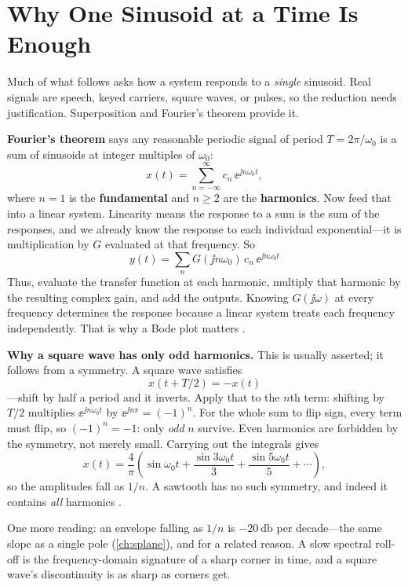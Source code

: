 \section{Why One Sinusoid at a Time Is Enough}
\label{sec:fourier}
Much of what follows asks how a system responds to a \emph{single} sinusoid. Real
signals are speech, keyed carriers, square waves, or pulses, so the reduction needs
justification. Superposition and Fourier's theorem provide it.

\textbf{Fourier's theorem} says any reasonable periodic signal of period
\(T=2\pi/\omega_0\) is a sum of sinusoids at integer multiples of \(\omega_0\):
\[
x(t)=\sum_{n=-\infty}^{\infty}c_n\,\ee^{\jj n\omega_0 t},
\]
where \(n=1\) is the \textbf{fundamental} and \(n\ge2\) are the
\textbf{harmonics}. Now feed that into a linear system. Linearity means the
response to a sum is the sum of the responses, and we already know the response to
each individual exponential---it is multiplication by \(G\) evaluated at that
frequency. So
\[
\boxed{\;y(t)=\sum_{n}G(\jj n\omega_0)\,c_n\,\ee^{\jj n\omega_0 t}\;}
\]
Thus, evaluate the transfer function at each harmonic, multiply that harmonic by
the resulting complex gain, and add the outputs. Knowing \(G(\jj\omega)\) at every
frequency determines the response because a linear system treats each frequency
independently. That is why a Bode plot matters
\cite[pp.~47--48, 54--56]{leigh2012control}.

\begin{physicalbox}
\textbf{Why a square wave has only odd harmonics.} This is usually asserted; it
follows from a symmetry. A square wave satisfies
\[
x(t+T/2)=-x(t)
\]
---shift by half a period and it inverts. Apply that to the \(n\)th term: shifting
by \(T/2\) multiplies \(\ee^{\jj n\omega_0t}\) by \(\ee^{\jj n\pi}=(-1)^n\). For the
whole sum to flip sign, every term must flip, so \((-1)^n=-1\): only \emph{odd}
\(n\) survive. Even harmonics are forbidden by the symmetry, not merely small.
Carrying out the integrals gives
\[
x(t)=\frac{4}{\pi}\left(\sin\omega_0t+\frac{\sin3\omega_0t}{3}
+\frac{\sin5\omega_0t}{5}+\cdots\right),
\]
so the amplitudes fall as \(1/n\). A sawtooth has no such symmetry, and indeed it
contains \emph{all} harmonics \cite[pp.~9--12]{carr2002components}.

One more reading: an envelope falling as \(1/n\) is \(-\SI{20}{\decibel}\) per
decade---the same slope as a single pole (\cref{ch:splane}), and for a related
reason. A slow spectral roll-off is the frequency-domain signature of a sharp
corner in time, and a square wave's discontinuity is as sharp as corners get.
\end{physicalbox}

